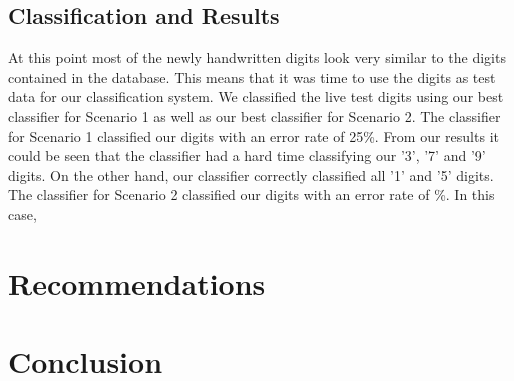 \documentclass[11pt,twoside,a4paper]{article}
\begin{document}

\subsection{Classification and Results}
At this point most of the newly handwritten digits look very similar to the digits contained in the database. This means that it was time to use the digits as test data for our classification system. We classified the live test digits using our best classifier for Scenario 1 as well as our best classifier for Scenario 2. 
\newline
\newline
The classifier for Scenario 1 classified our digits with an error rate of 25\%. From our results it could be seen that the classifier had a hard time classifying our '3', '7' and '9' digits. On the other hand, our classifier correctly classified all '1' and '5' digits.\newline
\newline
The classifier for Scenario 2 classified our digits with an error rate of \%. In this case,


\section{Recommendations}

\section{Conclusion}
\end{document}

